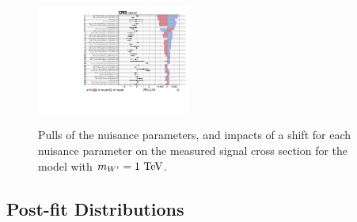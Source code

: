 \begin{figure}[htbp]
  \includegraphics[width=0.45\textwidth,page=6]{fig/fitValidation/impacts_WprToWH1000_6p_72.pdf}\\
  \caption{
    Pulls of the nuisance parameters, and impacts of a shift for each nuisance parameter on the measured signal cross section for the \DY\WprtoWH model with $m_{\Wpr}=1\unit{TeV}$.
  }
  \label{fig:impacts_WprToWH}
\end{figure}


\subsection{Post-fit Distributions}

